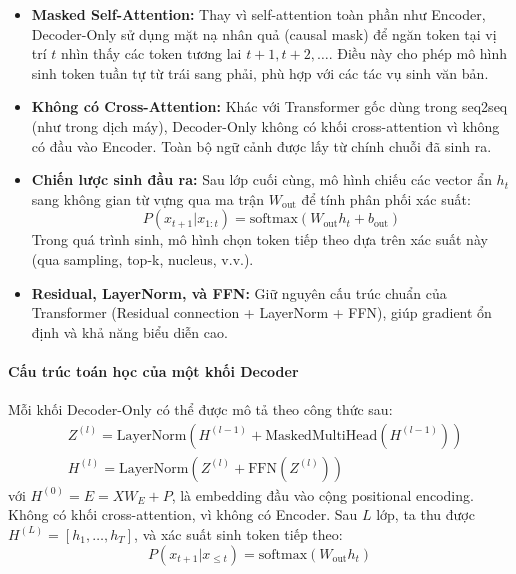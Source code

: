\begin{itemize}
	\item \textbf{Masked Self-Attention:}  
	Thay vì self-attention toàn phần như Encoder, Decoder-Only sử dụng mặt nạ nhân quả (causal mask) để ngăn token tại vị trí $t$ nhìn thấy các token tương lai $t+1, t+2, \dots$.  
	Điều này cho phép mô hình sinh token tuần tự từ trái sang phải, phù hợp với các tác vụ sinh văn bản.
	
	\item \textbf{Không có Cross-Attention:}  
	Khác với Transformer gốc dùng trong seq2seq (như trong dịch máy), Decoder-Only không có khối cross-attention vì không có đầu vào Encoder.  
	Toàn bộ ngữ cảnh được lấy từ chính chuỗi đã sinh ra.
	
	\item \textbf{Chiến lược sinh đầu ra:}  
	Sau lớp cuối cùng, mô hình chiếu các vector ẩn $h_t$ sang không gian từ vựng qua ma trận $W_{\text{out}}$ để tính phân phối xác suất:
	\[
	P(x_{t+1} | x_{1:t}) = \text{softmax}(W_{\text{out}} h_t + b_{\text{out}})
	\]
	Trong quá trình sinh, mô hình chọn token tiếp theo dựa trên xác suất này (qua sampling, top-k, nucleus, v.v.).
	
	\item \textbf{Residual, LayerNorm, và FFN:}  
	Giữ nguyên cấu trúc chuẩn của Transformer (Residual connection + LayerNorm + FFN), giúp gradient ổn định và khả năng biểu diễn cao.
\end{itemize}

\paragraph{Cấu trúc toán học của một khối Decoder}
Mỗi khối Decoder-Only có thể được mô tả theo công thức sau:
\[
\begin{aligned}
	&Z^{(l)} = \text{LayerNorm}(H^{(l-1)} + \text{MaskedMultiHead}(H^{(l-1)})) \\
	&H^{(l)} = \text{LayerNorm}(Z^{(l)} + \text{FFN}(Z^{(l)}))
\end{aligned}
\]
với $H^{(0)} = E = XW_E + P$, là embedding đầu vào cộng positional encoding.  
Không có khối cross-attention, vì không có Encoder.  
Sau $L$ lớp, ta thu được $H^{(L)} = [h_1, \dots, h_T]$, và xác suất sinh token tiếp theo:
\[
P(x_{t+1}|x_{\leq t}) = \text{softmax}(W_{\text{out}} h_t)
\]

